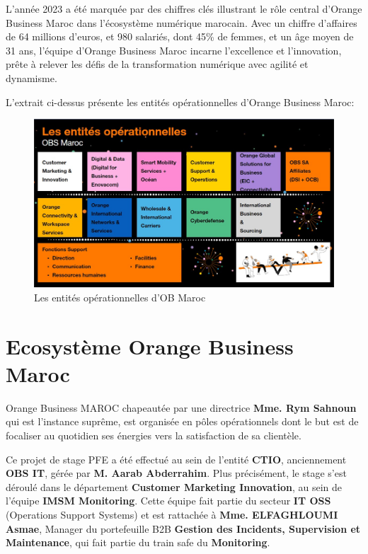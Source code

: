 \medskip

L’année 2023 a été marquée par des chiffres clés illustrant le rôle central d’Orange Business Maroc dans l’écosystème numérique marocain. 
Avec un chiffre d’affaires de 64 millions d’euros, et 980 salariés, dont 45\% de femmes, et un âge moyen de 31 ans, 
l’équipe d’Orange Business Maroc incarne l’excellence et l’innovation, 
prête à relever les défis de la transformation numérique avec agilité et dynamisme.

\medskip

L'extrait ci-dessus présente les entités opérationnelles d'Orange Business Maroc:

\begin{figure}[h]
    \centering
    \includegraphics[width=1\textwidth]{images/entités_opérationnelles.png}
    \caption{Les entités opérationnelles d’OB Maroc}
    \label{fig:obs_it_entites}
\end{figure}

\section{Ecosystème Orange Business Maroc}
Orange Business MAROC chapeautée par une directrice \textbf{Mme. Rym Sahnoun} qui est l’instance
suprême, est organisée en pôles opérationnels dont le but est de focaliser au quotidien ses
énergies vers la satisfaction de sa clientèle.

\medskip

Ce projet de stage PFE a été effectué au sein de l'entité \textbf{CTIO}, anciennement \textbf{OBS IT}, gérée par \textbf{M. Aarab Abderrahim}. 
Plus précisément, le stage s'est déroulé dans le département \textbf{Customer Marketing Innovation}, au sein de l'équipe \textbf{IMSM Monitoring}. 
Cette équipe fait partie du secteur \textbf{IT OSS} (Operations Support Systems) et est rattachée à \textbf{Mme. ELFAGHLOUMI Asmae}, 
Manager du portefeuille B2B \textbf{Gestion des Incidents, Supervision et Maintenance}, qui fait partie du train safe du \textbf{Monitoring}.

